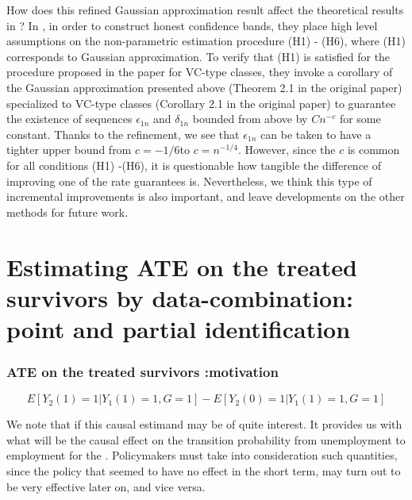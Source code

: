 \documentclass{article}
\begin{document}
\begin{remark}
    How does this refined Gaussian approximation result affect the theoretical results in \cite{chernozhukov2014anti}? In \cite{chernozhukov2014anti}, in order to construct honest confidence bands, they place high level assumptions on the non-parametric estimation procedure (H1) - (H6), where (H1) corresponds to Gaussian approximation. To verify that (H1) is satisfied for the procedure proposed in the paper for VC-type classes, they invoke a corollary of the Gaussian approximation presented above (Theorem 2.1 in the original paper) specialized to VC-type classes (Corollary 2.1 in the original paper) to guarantee the existence of sequences $\epsilon_{1n} $ and $\delta_{1n}$ bounded from above by $C n^{-c} $ for some constant. Thanks to the refinement, we see that $\epsilon_{1n}$ can be taken to have a tighter upper bound from $c = {-1/6} $to $c= n^{-1/4} $. However, since the $c$ is common for all conditions (H1) -(H6), it is questionable how tangible the difference of improving one of the rate guarantees is. Nevertheless, we think this type of incremental improvements is also important, and leave developments on the other methods for future work.
\end{remark}








\part{Estimating ATE on the treated survivors by data-combination: point and partial identification}



\section{ATE on the treated survivors :motivation}
\label{sec: atets1}
\begin{definition}
    \[E[Y_2(1) =1| Y_1(1)=1, G=1 ] - E[ Y_2(0) = 1 | Y_1(1) =1, G=1]\]
\end{definition}

We note that if this causal estimand may be of quite interest. It provides us with what will be the causal effect on the transition probability from unemployment to employment for the . Policymakers must take into consideration such quantities, since the policy that seemed to have no effect in the short term, may turn out to be very effective later on, and vice versa.
\end{document}
